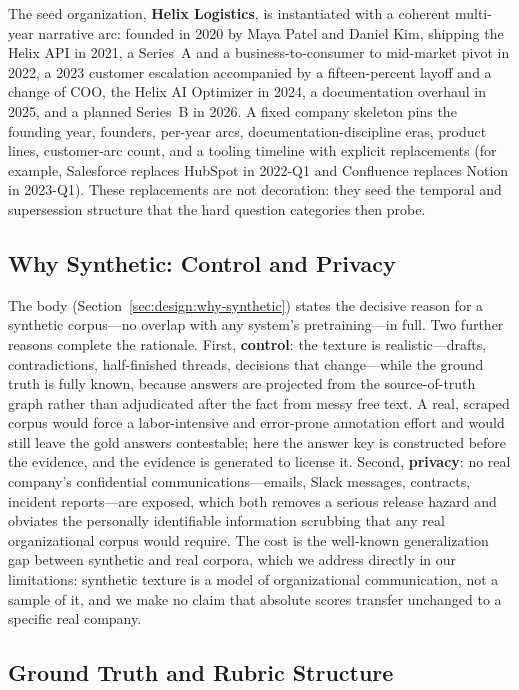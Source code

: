 The seed organization, \textbf{Helix Logistics}, is instantiated with a coherent
multi-year narrative arc: founded in 2020 by Maya Patel and Daniel Kim, shipping
the Helix API in 2021, a Series~A and a business-to-consumer to mid-market pivot
in 2022, a 2023 customer escalation accompanied by a fifteen-percent layoff and a
change of COO, the Helix AI Optimizer in 2024, a documentation overhaul in 2025,
and a planned Series~B in 2026. A fixed company skeleton pins the founding year,
founders, per-year arcs, documentation-discipline eras, product lines,
customer-arc count, and a tooling timeline with explicit replacements (for
example, Salesforce replaces HubSpot in 2022-Q1 and Confluence replaces Notion in
2023-Q1). These replacements are not decoration: they seed the temporal and
supersession structure that the hard question categories then probe.

\subsection{Why Synthetic: Control and Privacy}
\label{app:construction:why-synthetic}

The body (Section~\ref{sec:design:why-synthetic}) states the decisive reason for a
synthetic corpus---no overlap with any system's pretraining---in full. Two further
reasons complete the rationale. First, \textbf{control}: the texture is
realistic---drafts, contradictions, half-finished threads, decisions that
change---while the ground truth is fully known, because answers are projected from
the source-of-truth graph rather than adjudicated after the fact from messy free
text. A real, scraped corpus would force a labor-intensive and error-prone
annotation effort and would still leave the gold answers contestable; here the
answer key is constructed before the evidence, and the evidence is generated to
license it. Second, \textbf{privacy}: no real company's confidential
communications---emails, Slack messages, contracts, incident reports---are
exposed, which both removes a serious release hazard and obviates the personally
identifiable information scrubbing that any real organizational corpus would
require. The cost is the well-known generalization gap between synthetic and real
corpora, which we address directly in our limitations: synthetic texture is a
model of organizational communication, not a sample of it, and we make no claim
that absolute scores transfer unchanged to a specific real company.

\subsection{Ground Truth and Rubric Structure}
\label{sec:design:rubric}


